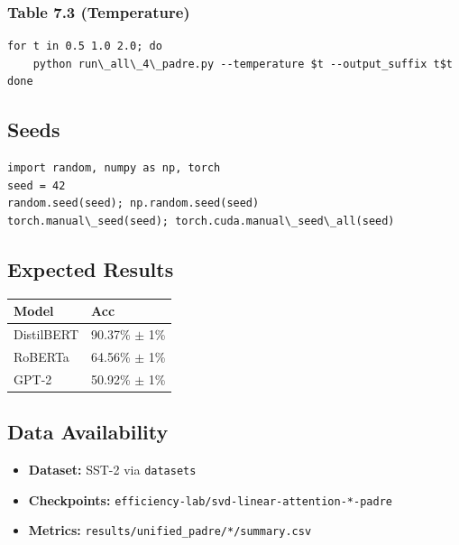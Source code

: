 \subsubsection{Table 7.3 (Temperature)}
\begin{lstlisting}
for t in 0.5 1.0 2.0; do
    python run\_all\_4\_padre.py --temperature $t --output_suffix t$t
done
\end{lstlisting}

\subsection{Seeds}

\begin{lstlisting}
import random, numpy as np, torch
seed = 42
random.seed(seed); np.random.seed(seed)
torch.manual\_seed(seed); torch.cuda.manual\_seed\_all(seed)
\end{lstlisting}

\subsection{Expected Results}

\begin{table}[H]
\centering
\small
\begin{tabular}{ll}
\toprule
\textbf{Model} & \textbf{Acc} \\
\midrule
DistilBERT & 90.37\% $\pm$ 1\% \\
RoBERTa & 64.56\% $\pm$ 1\% \\
GPT-2 & 50.92\% $\pm$ 1\% \\
\bottomrule
\end{tabular}
\end{table}

\subsection{Data Availability}

\begin{itemize}
\item \textbf{Dataset:} SST-2 via \texttt{datasets}
\item \textbf{Checkpoints:} \texttt{efficiency-lab/svd-linear-attention-*-padre}
\item \textbf{Metrics:} \texttt{results/unified\_padre/*/summary.csv}

\end{itemize}
